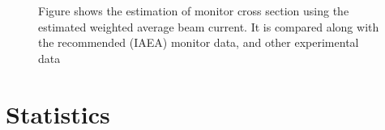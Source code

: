 \documentclass[a4paper,11pt,twoside]{book}
\begin{document}
\begin{figure}
    \quad
    \quad
    \quad
    \quad
    \caption{Figure shows the estimation of monitor cross section using the estimated weighted average beam current. It is compared along with the recommended (IAEA) monitor data, and other experimental data  }%
    \label{fig:monitor_BC+CS}%
\end{figure}




\appendix 

\chapter{Statistics} \label{ch_app:statistics}
\end{document}
